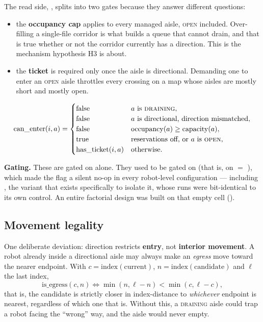The read side, , splits into two gates because they
answer different questions:

\begin{itemize}
\item the \textbf{occupancy cap} applies to every managed aisle,
  \textsc{open} included. Over-filling a single-file corridor is what builds a
  queue that cannot drain, and that is true whether or not the corridor
  currently has a direction. This is the mechanism hypothesis H3 is about.
\item the \textbf{ticket} is required only once the aisle is directional.
  Demanding one to enter an \textsc{open} aisle throttles every crossing on a
  map whose aisles are mostly short and mostly open.
\end{itemize}

\begin{equation}
  \mathrm{can\_enter}(i, a) =
  \begin{cases}
    \text{false} & a \text{ is \textsc{draining}},\\
    \text{false} & a \text{ is directional, direction mismatched},\\
    \text{false} & \mathrm{occupancy}(a) \geq \mathrm{capacity}(a),\\
    \text{true} & \text{reservations off, or } a \text{ is \textsc{open}},\\
    \mathrm{has\_ticket}(i, a) & \text{otherwise.}
  \end{cases}
\end{equation}

\begin{caveat}
\textbf{Gating.} These are gated on  alone. They used to be
gated on  (that is, on
 $=$ ), which made the flag a silent
no-op in every robot-level configuration --- including ,
the variant that exists specifically to isolate it, whose runs were
bit-identical to its own control. An entire factorial design was built on that
empty cell ().
\end{caveat}

\subsection{Movement legality}
\label{sec:aisle-legality}

One deliberate deviation: direction restricts \textbf{entry}, not
\textbf{interior movement}. A robot already inside a directional aisle may
always make an \emph{egress} move toward the nearer endpoint. With
$c = \mathrm{index}(\text{current})$, $n = \mathrm{index}(\text{candidate})$
and $\ell$ the last index,
\begin{equation}
  \mathrm{is\_egress}(c, n) \iff
    \min(n, \ell - n) < \min(c, \ell - c),
\end{equation}
that is, the candidate is strictly closer in index-distance to \emph{whichever}
endpoint is nearest, regardless of which one that is. Without this, a
\textsc{draining} aisle could trap a robot facing the ``wrong'' way, and the
aisle would never empty.
